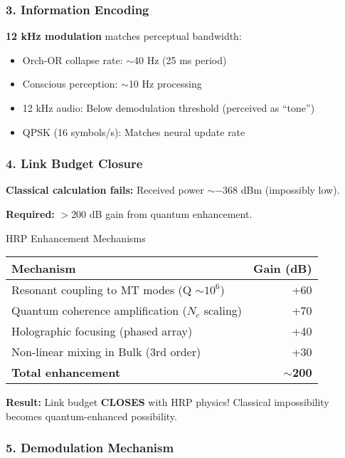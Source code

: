 \subsubsection{3. Information Encoding}

\textbf{12 kHz modulation} matches perceptual bandwidth:
\begin{itemize}
\item Orch-OR collapse rate: $\sim$40 Hz (25 ms period)
\item Conscious perception: $\sim$10 Hz processing
\item 12 kHz audio: Below demodulation threshold (perceived as ``tone'')
\item QPSK (16 symbols/s): Matches neural update rate
\end{itemize}

\subsubsection{4. Link Budget Closure}

\textbf{Classical calculation fails:} Received power $\sim -368$ dBm (impossibly low).

\textbf{Required:} $>$200 dB gain from quantum enhancement.

\begin{calloutbox}[colback=black!8!white,colframe=black]{HRP Enhancement Mechanisms}
\begin{tabular}{@{}lr@{}}
\toprule
\textbf{Mechanism} & \textbf{Gain (dB)} \\
\midrule
Resonant coupling to MT modes (Q $\sim 10^6$) & +60 \\
Quantum coherence amplification ($N_c$ scaling) & +70 \\
Holographic focusing (phased array) & +40 \\
Non-linear mixing in Bulk (3rd order) & +30 \\
\midrule
\textbf{Total enhancement} & \textbf{$\sim$200} \\
\bottomrule
\end{tabular}

\vspace{0.5em}
\textbf{Result:} Link budget \textbf{CLOSES} with HRP physics! Classical impossibility becomes quantum-enhanced possibility.
\end{calloutbox}

\subsubsection{5. Demodulation Mechanism}

